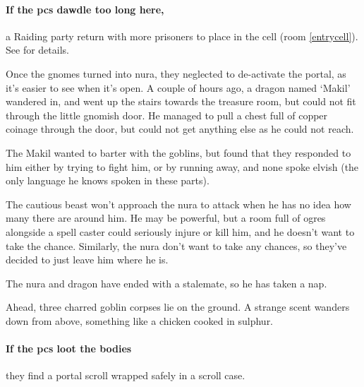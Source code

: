 \begin{multicols}{2}
\paragraph{If the \glspl{pc} dawdle too long here,}
a Raiding party return with more prisoners to place in the cell (room \ref{entrycell}).
See  for details.


\begin{exampletext}

  Once the gnomes turned into nura, they neglected to de-activate the portal, as it's easier to see when it's open.
  A couple of hours ago, a dragon named `Makil' wandered in, and went up the stairs towards the treasure room, but could not fit through the little gnomish door.
  He managed to pull a chest full of copper coinage through the door, but could not get anything else as he could not reach.

  The Makil wanted to barter with the goblins, but found that they responded to him either by trying to fight him, or by running away, and none spoke elvish (the only language he knows spoken in these parts).

  The cautious beast won't approach the nura to attack when he has no idea how many there are around him.
  He may be powerful, but a room full of ogres alongside a spell caster could seriously injure or kill him, and he doesn't want to take the chance.
  Similarly, the nura don't want to take any chances, so they've decided to just leave him where he is.

  The nura and dragon have ended with a stalemate, so he has taken a nap.

\end{exampletext}

\begin{boxtext}

  Ahead, three charred goblin corpses lie on the ground.
  A strange scent wanders down from above, something like a chicken cooked in sulphur.

\end{boxtext}

\paragraph{If the \glspl{pc} loot the bodies}
they find a portal scroll wrapped safely in a scroll case.



\end{multicols}
